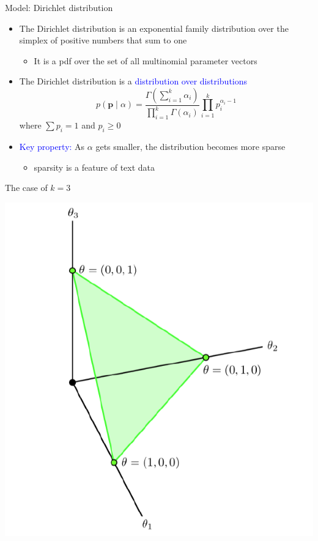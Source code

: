 \documentclass[english]{beamer}
\begin{document}
\begin{frame}{Model: Dirichlet distribution}
\begin{itemize}
\setlength{\itemsep}{1.5em}
    \item The Dirichlet distribution is an exponential family distribution over the simplex of positive numbers that sum to one
    \begin{itemize}\vspace{5pt}
        \item It is a pdf over the set of all multinomial parameter vectors
    \end{itemize}
    \item The Dirichlet distribution is a \textcolor{blue}{distribution over distributions}
$$
p(\mathbf{p} \mid \alpha)=\frac{\Gamma\left(\sum_{i=1}^{k} \alpha_{i}\right)}{\prod_{i=1}^{k} \Gamma\left(\alpha_{i}\right)} \prod_{i=1}^{k} p_{i}^{\alpha_{i}-1}
$$
where $\sum p_{i}=1$ and $p_{i} \geq 0$
\item \textcolor{blue}{Key property:} As $\alpha$ gets smaller, the distribution becomes more sparse
\begin{itemize}\vspace{5pt}
    \item sparsity is a feature of text data
\end{itemize}
\end{itemize}
\end{frame}
\begin{frame}{The case of $k=3$}
\begin{center}
\includegraphics[scale=0.37]{Images/case3.png}
\end{center}
\end{frame}
\end{document}
